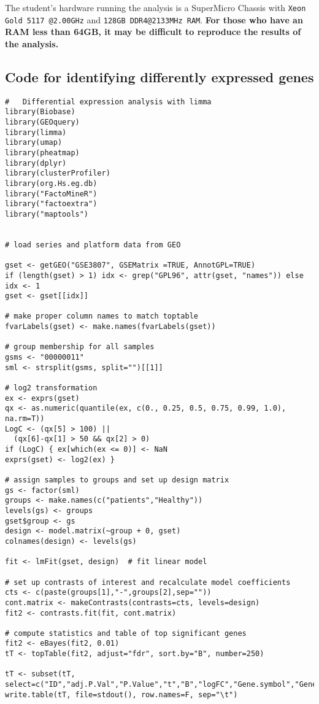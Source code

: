 The student's hardware running the analysis is a SuperMicro Chassis with \lstinline{Xeon Gold 5117 @2.00GHz} and \lstinline{128GB DDR4@2133MHz RAM}. \textbf{For those who have an RAM less than 64GB, it may be difficult to reproduce the results of the analysis.}

\subsection*{Code for identifying differently expressed genes}
\begin{lstlisting}
#   Differential expression analysis with limma
library(Biobase)
library(GEOquery)
library(limma)
library(umap)
library(pheatmap)
library(dplyr)
library(clusterProfiler)
library(org.Hs.eg.db)
library("FactoMineR")
library("factoextra")
library("maptools")


# load series and platform data from GEO

gset <- getGEO("GSE3807", GSEMatrix =TRUE, AnnotGPL=TRUE)
if (length(gset) > 1) idx <- grep("GPL96", attr(gset, "names")) else idx <- 1
gset <- gset[[idx]]

# make proper column names to match toptable 
fvarLabels(gset) <- make.names(fvarLabels(gset))

# group membership for all samples
gsms <- "00000011"
sml <- strsplit(gsms, split="")[[1]]

# log2 transformation
ex <- exprs(gset)
qx <- as.numeric(quantile(ex, c(0., 0.25, 0.5, 0.75, 0.99, 1.0), na.rm=T))
LogC <- (qx[5] > 100) ||
  (qx[6]-qx[1] > 50 && qx[2] > 0)
if (LogC) { ex[which(ex <= 0)] <- NaN
exprs(gset) <- log2(ex) }

# assign samples to groups and set up design matrix
gs <- factor(sml)
groups <- make.names(c("patients","Healthy"))
levels(gs) <- groups
gset$group <- gs
design <- model.matrix(~group + 0, gset)
colnames(design) <- levels(gs)

fit <- lmFit(gset, design)  # fit linear model

# set up contrasts of interest and recalculate model coefficients
cts <- c(paste(groups[1],"-",groups[2],sep=""))
cont.matrix <- makeContrasts(contrasts=cts, levels=design)
fit2 <- contrasts.fit(fit, cont.matrix)

# compute statistics and table of top significant genes
fit2 <- eBayes(fit2, 0.01)
tT <- topTable(fit2, adjust="fdr", sort.by="B", number=250)

tT <- subset(tT, select=c("ID","adj.P.Val","P.Value","t","B","logFC","Gene.symbol","Gene.title"))
write.table(tT, file=stdout(), row.names=F, sep="\t")


\end{lstlisting}
